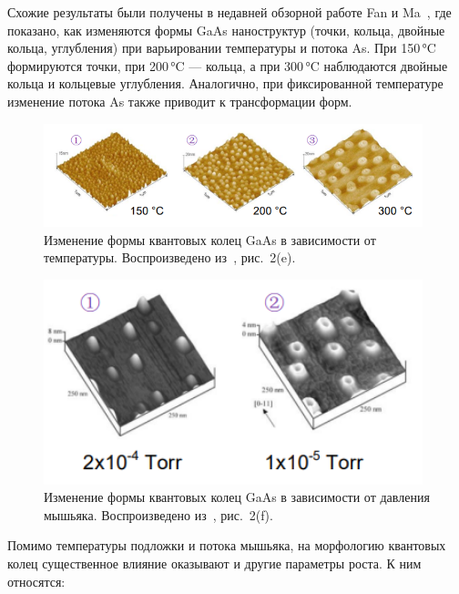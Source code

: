 \documentclass[14pt,oneside]{extarticle}
\begin{document}
Схожие результаты были получены в недавней обзорной работе Fan и Ma~\cite{fan2023}, где показано, как изменяются формы GaAs наноструктур (точки, кольца, двойные кольца, углубления) при варьировании температуры и потока As. При 150 °C формируются точки, при 200 °C — кольца, а при 300 °C наблюдаются двойные кольца и кольцевые углубления. Аналогично, при фиксированной температуре изменение потока As также приводит к трансформации форм.

\begin{figure}
    \begin{center}
        \includegraphics[width=11cm]{images/fanma_fig2e_left.png}
        \caption{\label{fig:fanma_temp}
            Изменение формы квантовых колец GaAs в зависимости от температуры. Воспроизведено из~\cite{fan2023}, рис.~2(e).}
    \end{center}
\end{figure}

\begin{figure}
    \begin{center}
        \includegraphics[width=11cm]{images/fanma_fig2e_right.png}
        \caption{\label{fig:fanma_pressure}
            Изменение формы квантовых колец GaAs в зависимости от давления мышьяка. Воспроизведено из~\cite{fan2023}, рис.~2(f).}
    \end{center}
\end{figure}

Помимо температуры подложки и потока мышьяка, на морфологию квантовых колец существенное влияние оказывают и другие параметры роста. К ним относятся:
\end{document}

